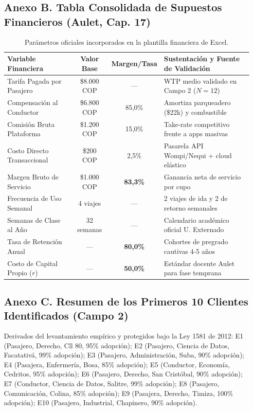 \documentclass[11pt,a4paper]{article}
\begin{document}
\subsection*{Anexo B. Tabla Consolidada de Supuestos Financieros (Aulet, Cap. 17)}
\begin{table}[h!]
\centering
\small
\renewcommand{\arraystretch}{1.3}
\begin{tabularx}{\textwidth}{p{5cm}ccX}
\toprule
\textbf{Variable Financiera} & \textbf{Valor Base} & \textbf{Margen/Tasa} & \textbf{Sustentaci\'on y Fuente de Validaci\'on} \\
\midrule
Tarifa Pagada por Pasajero & \$8.000 COP & --- & WTP medio validado en Campo 2 ($N=12$) \\
Compensaci\'on al Conductor & \$6.800 COP & 85,0\% & Amortiza parqueadero (\$22k) y combustible \\
Comisi\'on Bruta Plataforma & \$1.200 COP & 15,0\% & Take-rate competitivo frente a apps masivas \\
Costo Directo Transaccional & \$200 COP & 2,5\% & Pasarela API Wompi/Nequi + cloud el\'astico \\
Margen Bruto de Servicio & \$1.000 COP & \textbf{83,3\%} & Ganancia neta de servicio por cupo \\
Frecuencia de Uso Semanal & 4 viajes & --- & 2 viajes de ida y 2 de retorno semanales \\
Semanas de Clase al A\~no & 32 semanas & --- & Calendario acad\'emico oficial U. Externado \\
Tasa de Retenci\'on Anual & --- & \textbf{80,0\%} & Cohortes de pregrado cautivas 4-5 a\~nos \\
Costo de Capital Propio ($r$) & --- & \textbf{50,0\%} & Est\'andar docente Aulet para fase temprana \\
\bottomrule
\end{tabularx}
\caption{Par\'ametros oficiales incorporados en la plantilla financiera de Excel.}
\label{tab:anexo_finanzas}
\end{table}

\subsection*{Anexo C. Resumen de los Primeros 10 Clientes Identificados (Campo 2)}
Derivados del levantamiento emp\'irico y protegidos bajo la Ley 1581 de 2012: E1 (Pasajero, Derecho, Cll 80, 95\% adopci\'on); E2 (Pasajero, Ciencia de Datos, Facatativ\'a, 99\% adopci\'on); E3 (Pasajero, Administraci\'on, Suba, 90\% adopci\'on); E4 (Pasajera, Enfermer\'ia, Bosa, 85\% adopci\'on); E5 (Conductor, Econom\'ia, Cedritos, 95\% adopci\'on); E6 (Pasajero, Derecho, San Crist\'obal, 90\% adopci\'on); E7 (Conductor, Ciencia de Datos, Salitre, 99\% adopci\'on); E8 (Pasajero, Comunicaci\'on, Colina, 85\% adopci\'on); E9 (Pasajera, Derecho, Timiza, 100\% adopci\'on); E10 (Pasajero, Industrial, Chapinero, 90\% adopci\'on).
\end{document}
